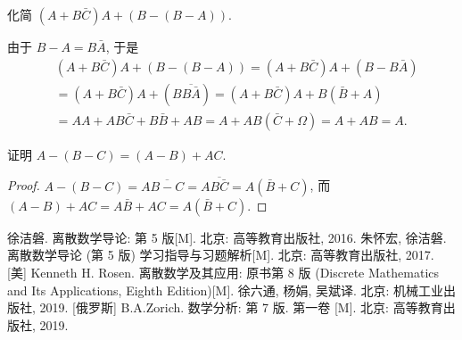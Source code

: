 \documentclass[10pt,UTF8]{book} %
\begin{document}
\begin{exercise}
    化简 $\left(A + B\bar C \right) A + (B - (B - A))$.
    \begin{sol}
        由于 $B - A = B\bar A$, 于是
        \[ 
        \begin{aligned}
            &\left(A + B\bar C \right) A + (B - (B - A))
            = \left(A + B\bar C \right) A + (B - B\bar A) \\
            &= \left(A + B\bar C \right) A + (B \overline{B \bar A})
            = \left(A + B\bar C \right) A + B (\bar B + A) \\
            &= AA + AB\bar C + B\bar B + AB
            = A + AB \left( \bar C + \varOmega \right)
            = A + AB = A.
        \end{aligned}\]
    \end{sol}
\end{exercise}

\begin{exercise}
    证明 $A - (B - C) = (A - B) + AC$.
    \begin{proof}
        $A - (B - C) = A \overline{B-C} = A \overline{B \bar C}
        = A \left( \bar B + C \right)$,
        而 $(A-B) + AC = A\bar B + AC = A \left( \bar B + C \right)$.
    \end{proof}
\end{exercise}



\onecolumn
\begin{thebibliography}{1}
    徐洁磐. 离散数学导论: 第 5 版[M]. 北京: 高等教育出版社, 2016.
    朱怀宏, 徐洁磐. 离散数学导论 (第 5 版) 学习指导与习题解析[M].
    北京: 高等教育出版社, 2017.
    [美] Kenneth H. Rosen. 离散数学及其应用: 原书第 8 版 (Discrete Mathematics 
    and Its Applications, Eighth Edition)[M]. 徐六通, 杨娟, 吴斌译.
    北京: 机械工业出版社, 2019.
    [俄罗斯] B.A.Zorich. 数学分析: 第 7 版. 第一卷 [M].
    北京: 高等教育出版社, 2019.
\end{thebibliography}

\end{document}
